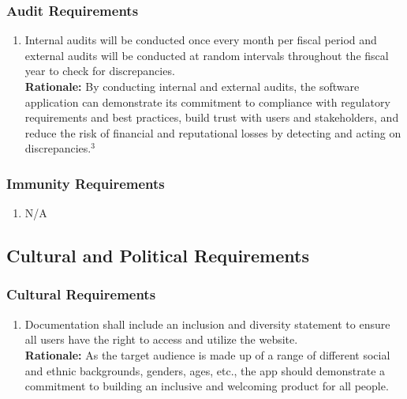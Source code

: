 \documentclass[]{article}
\begin{document}
\subsubsection{Audit Requirements}
\label{ssub:audit_requirements}
\begin{enumerate}[{SR-AU}1. ]
	\item Internal audits will be conducted once every month per fiscal period and external audits will be conducted at random intervals throughout the fiscal year to check for discrepancies.\\
	{\bf Rationale:} By conducting internal and external audits, the software application can demonstrate its commitment to compliance with regulatory requirements and best practices, build trust with users and stakeholders, and reduce the risk of financial and reputational losses by detecting and acting on discrepancies.$^3$
\end{enumerate}

\subsubsection{Immunity Requirements}
\label{ssub:immunity_requirements}
\begin{enumerate}[{SR-IM}1. ]
	\item N/A
\end{enumerate}


\subsection{Cultural and Political Requirements}
\label{sub:cultural_and_political_requirements}

\subsubsection{Cultural Requirements}
\label{ssub:cultural_requirements}
\begin{enumerate}[{CP-C}1. ]
	\item Documentation shall include an inclusion and diversity statement to ensure all users have the right to access and utilize the website.\\
	{\bf Rationale:} As the target audience is made up of a range of different social and ethnic backgrounds, genders, ages, etc., the app should demonstrate a commitment to building an inclusive and welcoming product for all people. 
\end{enumerate}
\end{document}
